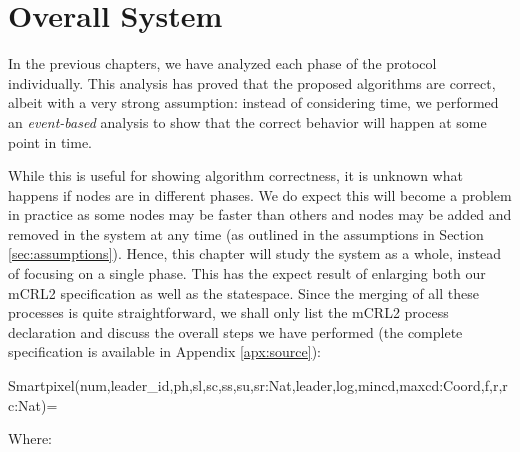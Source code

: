 \chapter{Overall System}
\label{ch:overallsystem}

In the previous chapters, we have analyzed each phase of the protocol individually. This analysis has proved that the proposed algorithms are correct, albeit with a very strong assumption: instead of considering time, we performed an \emph{event-based} analysis to show that the correct behavior will happen at some point in time.

While this is useful for showing algorithm correctness, it is unknown what happens if nodes are in different phases. We do expect this will become a problem in practice as some nodes may be faster than others and nodes may be added and removed in the system at any time (as outlined in the assumptions in Section \ref{sec:assumptions}). Hence, this chapter will study the system as a whole, instead of focusing on a single phase. This has the expect result of enlarging both our mCRL2 specification as well as the statespace. Since the merging of all these processes is quite straightforward, we shall only list the mCRL2 process declaration and discuss the overall steps we have performed (the complete specification is available in Appendix \ref{apx:source}):

\begin{codeverb}
Smartpixel(num,leader_id,ph,sl,sc,ss,su,sr:Nat,leader,log,mincd,maxcd:Coord,f,r,rc:Nat)=
\end{codeverb}

Where:

